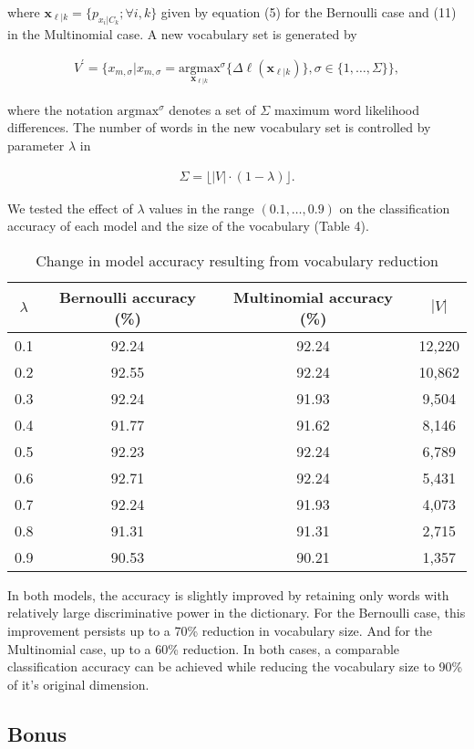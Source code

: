 \documentclass{article}
\renewcommand{\vec}[1]{\mathbf{#1}}
\begin{document}
\noindent
where $\vec{x}_{\ell|k} = \{p_{x_i|C_k}; \forall i,k\}$ given by equation (5) for the Bernoulli case and (11) in the Multinomial case. A new vocabulary set is generated by

\begin{align}
V^{\prime} = \{x_{m,\sigma} | x_{m,\sigma} = \underset{\vec{x}_{\ell|k}}{\mathrm{argmax}}^\sigma \{\Delta \ell(\vec{x}_{\ell|k})\}, \sigma \in \{1, \dots ,\Sigma\}\},
\end{align}

\noindent
where the notation $\mathrm{argmax}^\sigma$ denotes a set of $\Sigma$ maximum word likelihood differences. The number of words in the new vocabulary set is controlled by parameter $\lambda$ in 

\begin{align}
\Sigma = \lfloor|V| \cdot (1-\lambda)\rfloor.
\end{align}

\noindent
We tested the effect of $\lambda$ values in the range $(0.1,\dots,0.9)$ on the classification accuracy of each model and the size of the vocabulary (Table 4).

\begin{table}[!htb]
\centering
\caption{Change in model accuracy resulting from vocabulary reduction}
\begin{tabular}{|c|c|c|c|} \hline
	$\lambda$ & Bernoulli accuracy (\%) & Multinomial accuracy (\%) & $|V|$ \\ \hline
	0.1 & 92.24 & 92.24 & 12,220 \\ \hline
	0.2 & 92.55 & 92.24 & 10,862 \\ \hline
	0.3 & 92.24 & 91.93 & 9,504 \\ \hline
	0.4 & 91.77 & 91.62 & 8,146 \\ \hline
	0.5 & 92.23 & 92.24 & 6,789 \\ \hline
	0.6 & 92.71 & 92.24 & 5,431 \\ \hline
	0.7 & 92.24 & 91.93 & 4,073 \\ \hline
	0.8 & 91.31 & 91.31 & 2,715 \\ \hline
	0.9 & 90.53 & 90.21 & 1,357 \\ \hline
\end{tabular}
\end{table}

\noindent
In both models, the accuracy is slightly improved by retaining only words with relatively large discriminative power in the dictionary. For the Bernoulli case, this improvement persists up to a 70\% reduction in vocabulary size. And for the Multinomial case, up to a 60\% reduction. In both cases, a comparable classification accuracy can be achieved while reducing the vocabulary size to 90\% of it's original dimension.

\subsection{Bonus}
\end{document}
